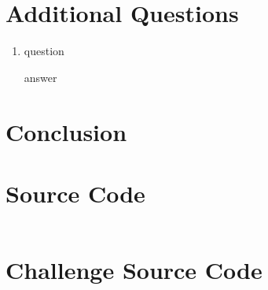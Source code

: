\documentclass[12pt,letterpaper]{article}
\begin{document}
\section{Additional Questions}
\begin{enumerate}

    \item question

        answer

\end{enumerate}

\section{Conclusion}

\section{Source Code}

\begin{verbatim}
\end{verbatim}

\pagebreak

\section{Challenge Source Code}

\begin{verbatim}
\end{verbatim}
\end{document}
